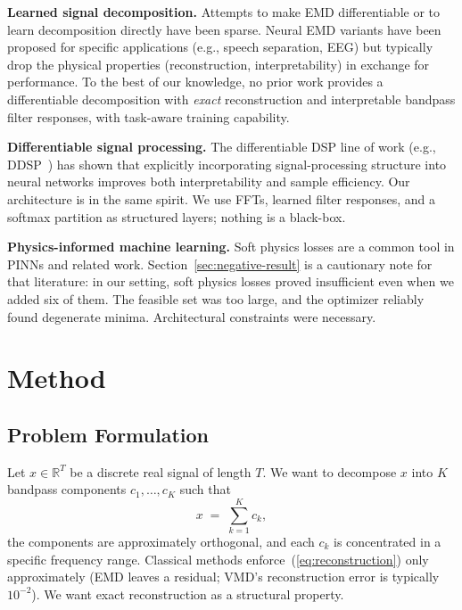 \documentclass[journal]{IEEEtran}
\begin{document}
\textbf{Learned signal decomposition.} Attempts to make EMD differentiable or to learn decomposition directly have been sparse. Neural EMD variants have been proposed for specific applications (e.g., speech separation, EEG) but typically drop the physical properties (reconstruction, interpretability) in exchange for performance. To the best of our knowledge, no prior work provides a differentiable decomposition with \emph{exact} reconstruction and interpretable bandpass filter responses, with task-aware training capability.

\textbf{Differentiable signal processing.} The differentiable DSP line of work (e.g., DDSP~\cite{ddsp2020}) has shown that explicitly incorporating signal-processing structure into neural networks improves both interpretability and sample efficiency. Our architecture is in the same spirit. We use FFTs, learned filter responses, and a softmax partition as structured layers; nothing is a black-box.

\textbf{Physics-informed machine learning.} Soft physics losses are a common tool in PINNs and related work. Section~\ref{sec:negative-result} is a cautionary note for that literature: in our setting, soft physics losses proved insufficient even when we added six of them. The feasible set was too large, and the optimizer reliably found degenerate minima. Architectural constraints were necessary.

\section{Method}
\label{sec:method}

\subsection{Problem Formulation}

Let $x \in \mathbb{R}^{T}$ be a discrete real signal of length $T$. We want to decompose $x$ into $K$ bandpass components $c_{1}, \ldots, c_{K}$ such that
\begin{equation}
x \;=\; \sum_{k=1}^{K} c_{k} ,
\label{eq:reconstruction}
\end{equation}
the components are approximately orthogonal, and each $c_{k}$ is concentrated in a specific frequency range. Classical methods enforce~(\ref{eq:reconstruction}) only approximately (EMD leaves a residual; VMD's reconstruction error is typically $10^{-2}$). We want exact reconstruction as a structural property.
\end{document}
